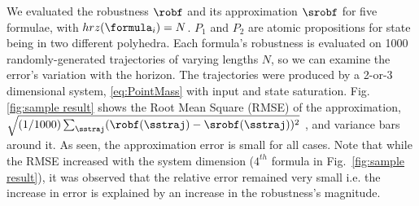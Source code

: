 We evaluated the robustness $\robf$ and its approximation $\srobf$ for five formulae, with $hrz(\formula_i) = N$. $P_1$ and $P_2$ are atomic propositions for state being in two different polyhedra.
Each formula's robustness is evaluated on 1000 randomly-generated trajectories of varying lengths $N$, so we can  examine the error's variation with the horizon.
The trajectories were produced by a 2-or-3 dimensional system, \eqref{eq:PointMass} with input and state saturation.
Fig. \ref{fig:sample result} shows the Root Mean Square (RMSE) of the approximation, $\sqrt{(1/1000)\sum_{\sstraj}(\robf(\sstraj)-\srobf(\sstraj))^2}$
, and variance bars around it. 
As seen, the approximation error is small for all cases.
Note that while the RMSE  increased with the system dimension ($4^{th}$ formula in Fig.~\ref{fig:sample result}), it was observed that the relative error remained very small i.e. the increase in error is explained by an increase in the robustness's magnitude. 
